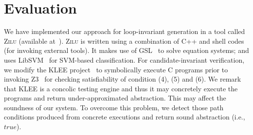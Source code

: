 \section{Evaluation} %
\label{sec:evaluations}
We have implemented our approach for loop-invariant generation in a tool called \textsc{Zilu} (available at~\cite{zilu:repo}).
\textsc{Zilu} is written using a combination of C++ and shell codes (for invoking external tools). It makes use of GSL~\cite{gough2009gnu} to solve equation systems; and uses LibSVM~\cite{chang2011libsvm} for SVM-based classification.
For candidate-invariant verification, we modify the KLEE project~\cite{cadar2008klee} to symbolically execute C programs prior to invoking Z3~\cite{de2008z3} for checking satisfiability of
condition (4), (5) and (6). We remark that KLEE is a concolic testing engine and thus it may concretely execute the programs and return under-approximated abstraction. This may affect the soundness of our system.
To overcome this problem, we detect those path conditions produced from concrete executions and return sound abstraction (i.e., $true$). %

